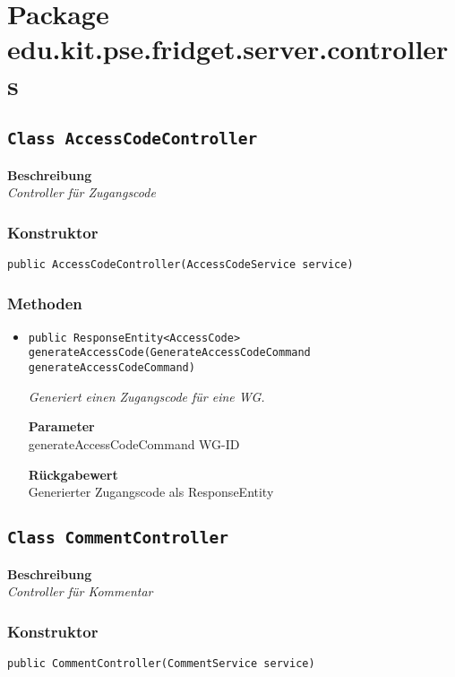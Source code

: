

%
    \section{Package edu.kit.pse.fridget.server.controllers}
    \subsection{\texttt{Class AccessCodeController}}
    \textbf{Beschreibung} \\
    \textit{Controller für Zugangscode}
    \subsubsection{Konstruktor}
    \texttt{public AccessCodeController(AccessCodeService service)}
    \subsubsection{Methoden}
    \begin{itemize}
    	\item{\texttt{public ResponseEntity<AccessCode> generateAccessCode(GenerateAccessCodeCommand generateAccessCodeCommand)}}
    	
    	\textit{Generiert einen Zugangscode für eine WG.}
    	
    	\textbf{Parameter} \\
    	generateAccessCodeCommand WG-ID
    	
    	\textbf{Rückgabewert} \\
    	Generierter Zugangscode als ResponseEntity
    \end{itemize}
    \subsection{\texttt{Class CommentController}}
    \textbf{Beschreibung} \\
    \textit{Controller für Kommentar}
    \subsubsection{Konstruktor}
    \texttt{public CommentController(CommentService service)}

